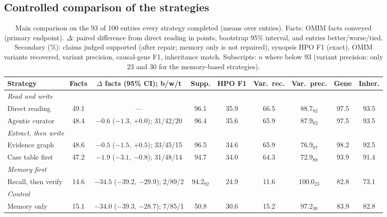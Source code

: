 \documentclass{article} %
\begin{document}
\subsection{Controlled comparison of the strategies}
\label{sec:main}
\begin{table}[t]
\caption{Main comparison on the 93 of 100 entries every strategy completed (means over entries). Facts: OMIM facts conveyed (primary endpoint). $\Delta$: paired difference from direct reading in points, bootstrap 95\% interval, and entries better/worse/tied. Secondary (\%): claims judged supported (after repair; memory only is not repaired), synopsis HPO F1 (exact), OMIM variants recovered, variant precision, causal-gene F1, inheritance match. Subscripts: $n$ where below 93 (variant precision: only 23 and 30 for the memory-based strategies).}
\label{tab:main}
\begin{center}
\footnotesize
\setlength{\tabcolsep}{2.2pt}
\begin{tabular}{lcccccccc}
\toprule
Strategy & Facts & $\Delta$ facts (95\% CI); b/w/t & Supp. & HPO F1 & Var.\ rec. & Var.\ prec. & Gene & Inher. \\
\midrule
\multicolumn{9}{l}{\emph{Read and write}} \\
Direct reading & 49.1 & --- & 96.1 & 35.9 & 66.5 & 88.7$_{82}$ & 97.5 & 93.5 \\
Agentic curator & 48.4 & $-0.6$ ($-1.3$, $+0.0$); 31/42/20 & 96.4 & 35.6 & 65.9 & 87.9$_{82}$ & 97.5 & 93.5 \\
\multicolumn{9}{l}{\emph{Extract, then write}} \\
Evidence graph & 48.6 & $-0.5$ ($-1.5$, $+0.5$); 33/45/15 & 96.5 & 34.6 & 65.9 & 76.9$_{87}$ & 98.2 & 92.5 \\
Case table first & 47.2 & $-1.9$ ($-3.1$, $-0.8$); 31/48/14 & 94.7 & 34.0 & 64.3 & 72.9$_{88}$ & 93.9 & 91.4 \\
\multicolumn{9}{l}{\emph{Memory first}} \\
Recall, then verify & 14.6 & $-34.5$ ($-39.2$, $-29.9$); 2/89/2 & 94.2$_{92}$ & 24.9 & 11.6 & 100.0$_{23}$ & 82.8 & 73.1 \\
\multicolumn{9}{l}{\emph{Control}} \\
Memory only & 15.1 & $-34.0$ ($-39.3$, $-28.7$); 7/85/1 & 50.8 & 30.6 & 15.2 & 97.2$_{30}$ & 83.9 & 82.8 \\
\bottomrule
\end{tabular}
\end{center}
\end{table}
\end{document}

